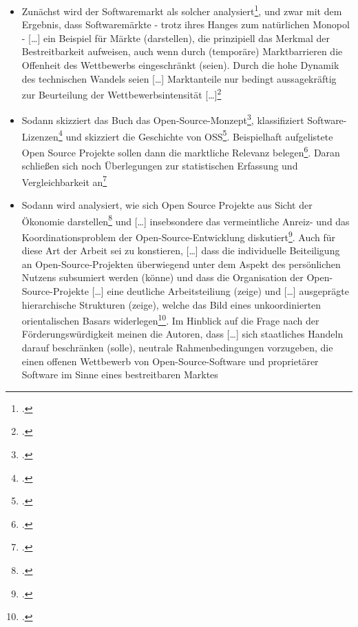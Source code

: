\documentclass[DIV=calc,BCOR=5mm,11pt,headings=small,oneside,abstract=true, toc=bib]{scrartcl}
\begin{document}
\begin{itemize}
  \item Zunächst wird der Softwaremarkt als solcher
  analysiert\footcite[vgl.][21ff]{Mundhenke2007a}, und zwar mit dem Ergebnis,
  dass Softwaremärkte - trotz ihres Hanges zum \glqq{}natürlichen Monopol\grqq{}
  - \glqq{}[\ldots] ein Beispiel für Märkte (darstellen), die prinzipiell
  das Merkmal der Bestreitbarkeit aufweisen, auch wenn durch (temporäre)
  Marktbarrieren die Offenheit des Wettbewerbs eingeschränkt (seien)\grqq{}.
  Durch die \glqq{}hohe Dynamik des technischen Wandels\grqq{} seien
  \glqq{}[\ldots] Marktanteile nur bedingt aussagekräftig zur Beurteilung
  der Wettbewerbsintensität [\ldots]\grqq{}\footcite[vgl.][3]{Mundhenke2007a}
  \item Sodann skizziert das Buch das
  \glqq{}Open-Source-Monzept\grqq{}\footcite[vgl.][40ff -
  Einzelheiten und Spezifisches]{Mundhenke2007a},  klassifiziert
  Software-Lizenzen\footcite[vgl.][48f -
  Einzelheiten und Spezifisches]{Mundhenke2007a} und skizziert die Geschichte
  von OSS\footcite[vgl.][50ff -
  Einzelheiten und Spezifisches]{Mundhenke2007a}. Beispielhaft aufgelistete Open
  Source Projekte sollen dann die \glqq{}marktliche Relevanz\grqq{}
  belegen\footcite[vgl.][54ff]{Mundhenke2007a}. Daran schließen sich noch
  Überlegungen zur statistischen Erfassung und Vergleichbarkeit
  an\footcite[vgl.][65ff]{Mundhenke2007a}
  \item Sodann wird analysiert, wie sich Open Source Projekte aus Sicht der
  Ökonomie darstellen\footcite[vgl.][69ff]{Mundhenke2007a} und \glqq{}[\ldots]
  insebsondere das vermeintliche Anreiz- und das
  Koordinationsproblem der Open-Source-Entwicklung
  diskutiert\grqq{}\footcite[vgl.][117f]{Mundhenke2007a}. Auch für diese Art
  der Arbeit sei zu konstieren, \glqq{}[\ldots] dass die
  individuelle Beiteiligung an Open-Source-Projekten überwiegend unter
  dem Aspekt des persönlichen Nutzens subsumiert werden (könne)\grqq{} und dass
  \glqq{}die Organisation der Open-Source-Projekte [\ldots] eine
  deutliche Arbeitsteiliung (zeige) und [\ldots] ausgeprägte
  hierarchische Strukturen (zeige), welche das Bild eines unkoordinierten
  orientalischen Basars widerlegen\grqq{}\footcite[vgl.][118]{Mundhenke2007a}.
  Im Hinblick auf die Frage nach der Förderungswürdigkeit meinen die Autoren,
  dass \glqq{}[\ldots] sich staatliches Handeln darauf beschränken
  (solle), neutrale Rahmenbedingungen vorzugeben, die einen offenen
  Wettbewerb von Open-Source-Software und proprietärer Software im Sinne
  eines bestreitbaren Marktes

\end{itemize}
\end{document}
